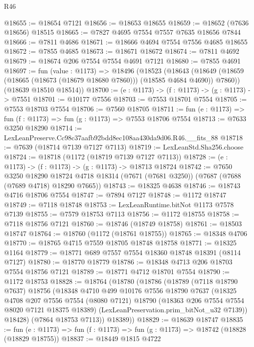 \begin{lexlean}{R46}
\begin{coremodule}
@18655 := @18654 @7121
@18656 := @18653 @18655
@18659 := @18652 (@7636 @18656) @18515
@18665 := @7827 @4695 @7554 @7557 @7635 @18656 @7844
@18666 := @7811 @4686
@18671 := @18666 @4694 @7554 @7556 @4685 @18655
@18672 := @7855 @4685
@18673 := @18671 @18672
@18674 := @7811 @4692
@18679 := @18674 @206 @7554 @7554 @4691 @7121
@18680 := @7855 @4691
@18697 := fun (value : @1173) =>
  @18496
    (@18523
      (@18643 (@18649 (@18659 (@18665 (@18673 (@18679 @18680 @7860))) (@18585 @4684 @4690)) @7860))
      (@18639 @18510 @18514))
@18700 := (e : @1173) -> (f : @1173) -> (g : @1173) -> @7551
@18701 := @10177 @7556
@18703 := @7553 @18701 @7554
@18705 := @7553 @18703 @7554
@18706 := @7560 @18705
@18711 := fun (e : @1173) => fun (f : @1173) => fun (g : @1173) => @7553 @18706 @7554
@18713 := @7633 @3250 @18290
@18714 := LexLeanPreserve.Cc98c37aafb92bdd8ec108aa430da9d06.R46.__fits_88
@18718 := @7639 (@18714 @7139 @7127 @7113)
@18719 := LexLeanStd.Sha256.choose
@18724 := @18718 (@1172 (@18719 @7139 @7127 @7113))
@18728 := (e : @1173) -> (f : @1173) -> (g : @1173) -> @18713 @18724
@18742 := @7650
    @3250
    @18290
    @18724
    @4718
    @18314
    (@7671 (@7681 @3250))
    (@7687 (@7688 (@7689 @4718) @18290 @7665))
@18743 := @18325 @4638
@18746 := @18743 @4716 @18706 @7554
@18747 := @7894 @7127
@18748 := @1172 @18747
@18749 := @7118 @18748
@18753 := LexLeanRuntime.bitNot @1173 @7578 @7139
@18755 := @7579 @18753 @7113
@18756 := @1172 @18755
@18758 := @7118 @18756 @7121
@18760 := @18746 (@18749 @18758)
@18761 := @18503 @18747
@18764 := @18760 (@1172 (@18761 @18755))
@18765 := @18348 @4706
@18770 := @18765 @4715 @7559 @18705 @18748 @18758
@18771 := @18325 @1164
@18779 := @18771 @689 @7557 @7554 @18360 @18748 @18391 (@8114 @7127)
@18780 := @18770 @18779
@18786 := @18348 @4713 @206 @18703 @7554 @18756 @7121
@18789 := @18771 @4712 @18701 @7554
@18790 := @1172 @18753
@18828 := @18764
    (@18780
      (@18786
        (@18789
          (@7118 @18790 @7637)
          @18756
          (@18348
            @4710
            @499
            @10176
            @7556
            @18790
            @7637
            (@18325
              @4708
              @207
              @7556
              @7554
              (@8080 @7121)
              @18790
              (@18363 @206 @7554 @7554 @8020 @7121 @18375 @18389)
              (LexLeanPreservation.prim_bitNot_u32 @7139))
            @18428)
          (@7864 @18753 @7113))
        @18389))
@18829 := @18639 @18747
@18835 := fun (e : @1173) => fun (f : @1173) => fun (g : @1173) => @18742 (@18828 (@18829 @18755))
@18837 := @18449 @1815 @4722

\end{coremodule}
\end{lexlean}
